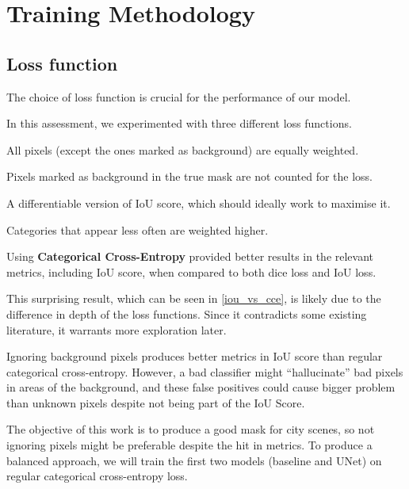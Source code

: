 \newcommand{\lt}{L\textsubscript{2}}

\section{Training Methodology}

\subsection{Loss function}
\label{loss_function_section}

The choice of loss function is crucial for the performance of our model.

In this assessment, we experimented with three different loss functions.

\begin{description}[style=nextline]
	\item[Categorical Cross-Entropy Loss] All pixels (except the ones marked as background) are equally weighted.
	\item[CCE loss ignoring background pixels] Pixels marked as background in the true mask are not counted for the loss.
	\item[Intersection over Union Loss] A differentiable version of IoU score, which should ideally work to maximise it.
	\item[Dice Loss] Categories that appear less often are weighted higher\cite{dice_loss}.
\end{description}

Using \textbf{Categorical Cross-Entropy} provided better results in the relevant metrics, including IoU score, when compared to both dice loss and IoU loss.

This surprising result, which can be seen in \cref{iou_vs_cce}, is likely due to the difference in depth of the loss functions.
Since it contradicts some existing literature\cite{dice_loss}, it warrants more exploration later.

Ignoring background pixels produces better metrics in IoU score than regular categorical cross-entropy.
However, a bad classifier might ``hallucinate'' bad pixels in areas of the background, and these false positives could cause bigger problem than unknown pixels despite not being part of the IoU Score.

The objective of this work is to produce a good mask for city scenes, so not ignoring pixels might be preferable despite the hit in metrics.
To produce a balanced approach, we will train the first two models (baseline and UNet) on regular categorical cross-entropy loss.

